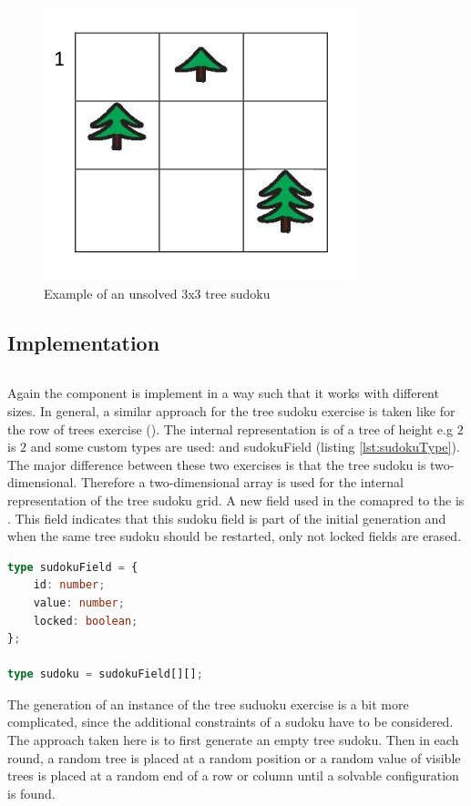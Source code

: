 \begin{figure} 
    \centering
    \includegraphics[width=0.4 \columnwidth]{figures/tree_sudoku_example.png}
    \caption{Example of an unsolved 3x3 tree sudoku} 
    \label{fig:tree_sudoku_example} 
\end{figure}

\subsection{Implementation}

\begin{lstlisting}[language=TypeScript,caption={},label={lst:}]
\end{lstlisting}

Again the  component is implement in a way such that it works with different sizes. In general, a similar approach for the tree sudoku exercise is taken like for the row of trees exercise (). The internal representation is of a tree of height e.g $2$ is $2$ and some custom types are used:  and {sudokuField} (listing \ref{lst:sudokuType}). The major difference between these two exercises is that the tree sudoku is two-dimensional. Therefore a two-dimensional array is used for the internal representation of the tree sudoku grid. A new field used in the  comapred to the  is . This field indicates that this sudoku field is part of the initial generation and when the same tree sudoku should be restarted, only not locked fields are erased.

\begin{lstlisting}[language=TypeScript,caption={Definition of the custom sudoku and sudokuField type},label={lst:sudokuType}]
type sudokuField = {
    id: number;
    value: number;
    locked: boolean;
};

type sudoku = sudokuField[][];
\end{lstlisting}

The generation of an instance of the tree suduoku exercise is a bit more complicated, since the additional constraints of a sudoku have to be considered. The approach taken here is to first generate an empty tree sudoku. Then in each round, a random tree is placed at a random position or a random value of visible trees is placed at a random end of a row or column until a solvable configuration is found. 

